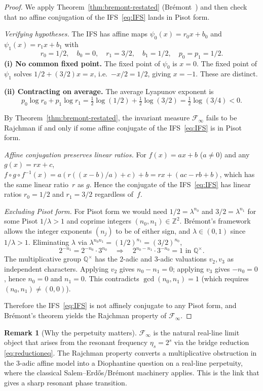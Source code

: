 \documentclass[11pt,a4paper]{amsart}
\theoremstyle{plain}
\theoremstyle{definition}
\newtheorem{remark}[theorem]{Remark}
\newcommand{\Z}{\mathbb{Z}}
\newcommand{\Q}{\mathbb{Q}}
\begin{document}
\begin{proof}
We apply Theorem~\ref{thm:bremont-restated} (Br\'emont~\cite[Theorem~2.5]{Bremont})
and then check that no affine conjugation of the IFS~\eqref{eq:IFS}
lands in Pisot form.

\emph{Verifying hypotheses.}
The IFS has affine maps $\psi_0(x)=r_0 x+b_0$ and $\psi_1(x)=r_1 x+b_1$
with
$$
r_0=1/2,\quad b_0=0,\quad r_1=3/2,\quad b_1=1/2,\quad p_0=p_1=1/2.
$$
\textbf{(i) No common fixed point.}
The fixed point of $\psi_0$ is $x=0$.
The fixed point of $\psi_1$ solves $1/2+(3/2)x=x$, i.e.\ $-x/2=1/2$, giving
$x=-1$.
These are distinct.

\textbf{(ii) Contracting on average.}
The average Lyapunov exponent is
$$
p_0\log r_0+p_1\log r_1=\tfrac12\log(1/2)+\tfrac12\log(3/2)
=\tfrac12\log(3/4)<0.
$$

By Theorem~\ref{thm:bremont-restated}, the invariant measure $\mathcal F_\infty$
fails to be Rajchman if and only if some affine conjugate of the
IFS~\eqref{eq:IFS} is in Pisot form.

\emph{Affine conjugation preserves linear ratios.}
For $f(x)=ax+b$ ($a\ne 0$) and any $g(x)=rx+c$,
$f\circ g\circ f^{-1}(x)=a(r((x-b)/a)+c)+b=rx+(ac-rb+b)$,
which has the same linear ratio~$r$ as $g$.
Hence the conjugate of the IFS~\eqref{eq:IFS} has linear ratios
$r_0=1/2$ and $r_1=3/2$ regardless of~$f$.

\emph{Excluding Pisot form.}
For Pisot form we would need $1/2=\lambda^{n_0}$ and $3/2=\lambda^{n_1}$
for some Pisot $1/\lambda>1$ and coprime integers $(n_0,n_1)\in\Z^2$.
Br\'emont's framework allows the integer exponents $(n_j)$ to be of
either sign, and $\lambda\in(0,1)$ since $1/\lambda>1$.
Eliminating $\lambda$ via $\lambda^{n_0 n_1}=(1/2)^{n_1}=(3/2)^{n_0}$,
$$
2^{-n_1}=2^{-n_0}\cdot 3^{n_0}
\quad\Longrightarrow\quad
2^{n_0-n_1}\cdot 3^{-n_0}=1\text{ in }\Q^\times.
$$
The multiplicative group $\Q^\times$ has the $2$-adic and $3$-adic
valuations $v_2,v_3$ as independent characters.
Applying $v_2$ gives $n_0-n_1=0$; applying $v_3$ gives $-n_0=0$, hence
$n_0=0$ and $n_1=0$.
This contradicts $\gcd(n_0,n_1)=1$ (which requires $(n_0,n_1)\ne(0,0)$).

Therefore the IFS~\eqref{eq:IFS} is not affinely conjugate to any Pisot
form, and Br\'emont's theorem yields the Rajchman property of
$\mathcal F_\infty$.
\end{proof}

\begin{remark}[Why the perpetuity matters]
$\mathcal F_\infty$ is the natural real-line limit object that arises from
the resonant frequency $\eta_s=2^s$ via the bridge reduction
\eqref{eq:reductioneq}.
The Rajchman property converts a multiplicative obstruction in the
$3$-adic affine model into a Diophantine question on a real-line
perpetuity, where the classical Salem--Erd\H{o}s/Brémont machinery applies.
This is the link that gives a sharp resonant phase transition.
\end{remark}
\end{document}
